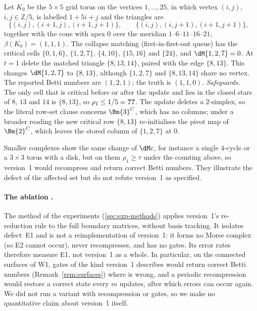 \begin{example}\label{ex:e2-torus}
Let $K_0$ be the $5\times5$ grid torus on the vertices $1,\dots,25$, in which
vertex $(i,j)$, $i,j\in\mathbb{Z}/5$, is labelled $1+5i+j$ and the triangles are
\[
  \{(i,j),(i{+}1,j),(i{+}1,j{+}1)\},\qquad \{(i,j),(i,j{+}1),(i{+}1,j{+}1)\},
\]
together with the cone with apex $0$ over the meridian $1$--$6$--$11$--$16$--$21$;
$\beta(K_0)=(1,1,1)$. The collapse matching (first-in-first-out queue) has the
critical cells $\{0,1,6\}$, $\{1,2,7\}$, $\{4,10\}$, $\{15,16\}$ and $\{24\}$, and
$\dM\{1,2,7\}=0$. At $t=1$ delete the matched triangle $\{8,13,14\}$, paired with
the edge $\{8,13\}$. This changes $\dM\{1,2,7\}$ to $\{8,13\}$, although
$\{1,2,7\}$ and $\{8,13,14\}$ share no vertex. The reported Betti numbers are
$(1,2,1)$; the truth is $(1,1,0)$.
\emph{Safeguards.} The only cell that is critical before or after the update
and lies in the closed stars of $8$, $13$ and $14$ is $\{8,13\}$, so
$\rho_1\le1/5=\textbf{??}$. The update deletes a $2$-simplex, so the literal
row-set clause concerns $\Bm{3}^C$, which has no columns; under a broader
reading the new critical row $\{8,13\}$ re-initialises the pivot map of
$\Bm{2}^C$, which leaves the stored column of $\{1,2,7\}$ at $0$.
\end{example}

Smaller complexes show the same change of $\dM c$, for instance a single
$4$-cycle or a $3\times3$ torus with a disk, but on them $\rho_1\ge\tau$ under
the counting above, so version~1 would recompress and return correct Betti
numbers. They illustrate the defect of the affected set but do not refute
version~1 as specified.

\paragraph{The ablation .}
The method  of the experiments (\cref{sec:exp-methods}) applies
version~1's re-reduction rule to the full boundary matrices, without basis
tracking. It isolates defect~E1 and is not a reimplementation of version~1: it
forms no Morse complex (so E2 cannot occur), never recompresses, and has no
gates. Its error rates therefore measure E1, not version~1 as a whole. In
particular, on the connected surfaces of W1, gates of the kind version~1
describes would return correct Betti numbers (Remark~\ref{rem:surfaces}) where
 is wrong, and a periodic recompression would restore a correct
state every $m$ updates, after which errors can occur again. We did not run a
variant with recompression or gates, so we make no quantitative claim about
version~1 itself.

